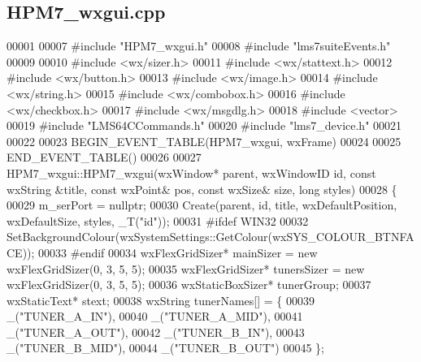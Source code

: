 \subsection{H\+P\+M7\+\_\+wxgui.\+cpp}
\label{HPM7__wxgui_8cpp_source}

\begin{DoxyCode}
00001 
00007 \textcolor{preprocessor}{#include "HPM7_wxgui.h"}
00008 \textcolor{preprocessor}{#include "lms7suiteEvents.h"}
00009 
00010 \textcolor{preprocessor}{#include <wx/sizer.h>}
00011 \textcolor{preprocessor}{#include <wx/stattext.h>}
00012 \textcolor{preprocessor}{#include <wx/button.h>}
00013 \textcolor{preprocessor}{#include <wx/image.h>}
00014 \textcolor{preprocessor}{#include <wx/string.h>}
00015 \textcolor{preprocessor}{#include <wx/combobox.h>}
00016 \textcolor{preprocessor}{#include <wx/checkbox.h>}
00017 \textcolor{preprocessor}{#include <wx/msgdlg.h>}
00018 \textcolor{preprocessor}{#include <vector>}
00019 \textcolor{preprocessor}{#include "LMS64CCommands.h"}
00020 \textcolor{preprocessor}{#include "lms7_device.h"}
00021 
00022 
00023 BEGIN\_EVENT\_TABLE(HPM7_wxgui, wxFrame)
00024 
00025 END\_EVENT\_TABLE()
00026 
00027 HPM7_wxgui::HPM7_wxgui(wxWindow* parent, wxWindowID \textcolor{keywordtype}{id}, const wxString &title, const wxPoint& pos, const 
      wxSize& size, \textcolor{keywordtype}{long} styles)
00028 \{
00029     m\_serPort = \textcolor{keyword}{nullptr};
00030     Create(parent, \textcolor{keywordtype}{id}, title, wxDefaultPosition, wxDefaultSize, styles, _T(\textcolor{stringliteral}{"id"}));
00031 \textcolor{preprocessor}{#ifdef WIN32}
00032     SetBackgroundColour(wxSystemSettings::GetColour(wxSYS\_COLOUR\_BTNFACE));
00033 \textcolor{preprocessor}{#endif}
00034     wxFlexGridSizer* mainSizer = \textcolor{keyword}{new} wxFlexGridSizer(0, 3, 5, 5);
00035     wxFlexGridSizer* tunersSizer = \textcolor{keyword}{new} wxFlexGridSizer(0, 3, 5, 5);
00036     wxStaticBoxSizer* tunerGroup;
00037     wxStaticText* stext;
00038     wxString tunerNames[] = \{
00039         \_(\textcolor{stringliteral}{"TUNER\_A\_IN"}),
00040         \_(\textcolor{stringliteral}{"TUNER\_A\_MID"}),
00041         \_(\textcolor{stringliteral}{"TUNER\_A\_OUT"}),
00042         \_(\textcolor{stringliteral}{"TUNER\_B\_IN"}),
00043         \_(\textcolor{stringliteral}{"TUNER\_B\_MID"}),
00044         \_(\textcolor{stringliteral}{"TUNER\_B\_OUT"})
00045     \};

\end{DoxyCode}
